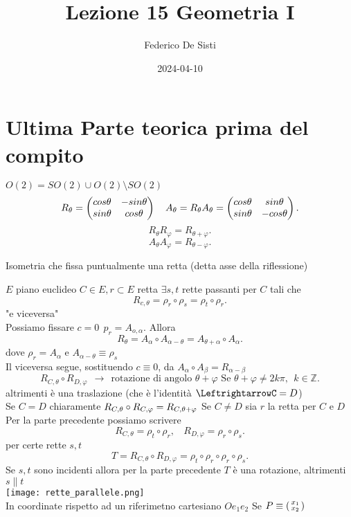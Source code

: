 \documentclass[12px]{article}
\title{Lezione 15 Geometria I}
\date{2024-04-10}
\author{Federico De Sisti}
\begin{document}
	\maketitle
	\newpage
	\section{Ultima Parte teorica prima del compito}
	$O(2) = SO(2) \cup O(2)\setminus SO(2)$
	\[
		R_\theta = \begin{pmatrix}cos\theta & -sin\theta\\ sin\theta& cos\theta\end{pmatrix}\ \ \ A_\theta = R_\theta A_\theta = \begin{pmatrix}cos\theta& sin\theta\\ sin\theta & -cos\theta\end{pmatrix}
	.\] 
	\[
		R_\theta R_\varphi = R_{\theta + \varphi}
	.\] 
	\[
		A_\theta A_ \varphi = R_{\theta - \varphi}
	.\] 
	\begin{defi}[Riflessione]
		Isometria che fissa puntualmente una retta (detta asse della riflessione)
	\end{defi}
	$E$ piano euclideo
	$C\in E, r\subset E$ retta $\exists s,t$ rette passanti per $C$ tali che
	\[
	 R_{c,\theta} = \rho_r \circ\rho_s = \rho_t\circ\rho_r	.\] 
	"e viceversa"\\
	Possiamo fissare $c = 0 \ \ p_r = A_{o,\alpha}.$ Allora
	\[
		R_\theta = A_\alpha\circ A_{\alpha - \theta} = A_{\theta + \alpha}\circ A_\alpha
	.\] 
	dove $\rho_r = A_\alpha$ e $A_{\alpha - \theta} \equiv \rho_s$
\\
Il viceversa segue, sostituendo $c\equiv 0$, da $A_\alpha\circ A_\beta = R_{\alpha - \beta}$
 \[
	 R_{C,\theta}\circ R_{D,\varphi} \ \ \rightarrow \ \ \text{rotazione di angolo } \theta + \varphi \text{ Se } \theta + \varphi\neq 2k\pi,\ \ k\in \mathbb{Z}
.\] 
altrimenti è una traslazione (che è l'identità $ \LeftrightarrowC = D$)\\
Se $C = D$ chiaramente $R_{C,\theta}\circ R_{C, \varphi} = R_{C,\theta + \varphi}\\$
Se $C \neq D$ sia $r$ la retta per $C$ e $D$ Per la parte precedente possiamo scrivere
\[
	R_{C,\theta} = \rho_t\circ\rho_r, \ \ \ \ R_{D,\varphi} = \rho_r\circ\rho_s
.\] 
per certe rette $s,t$ 
\[
	T = R_{C,\theta}\circ R_{D,\varphi} = \rho_t\circ\rho_r\circ\rho_r\circ\rho_s
.\] 
Se $s,t$ sono incidenti allora per la parte precedente $T$ è una rotazione, altrimenti $s\parallel t$\\
\texttt{[image: rette\_parallele.png]}\\
In coordinate rispetto ad un riferimetno cartesiano $Oe_1e_2$ Se $P\equiv\left(\begin{smallmatrix}x_1\\x_2\end{smallmatrix}\right)$ 
\end{document}
